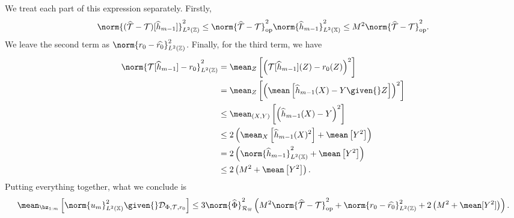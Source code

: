 We treat each part of this expression separately.
Firstly,
\begin{align*}
    \norm{ ( \hat{ \mathcal{T} } - \mathcal{T} ) [ \hat{ h }_{ m-1 } ] }_{ L^2 ( \mathbb{Z} ) }^2
    \leq \norm{ \hat{ \mathcal{T} } - \mathcal{T} }_{ \mathrm{op} }^2 \norm{ \hat{ h }_{ m-1 } }_{ L^2 ( \mathbb{X} ) }^2
    \leq M^2 \norm{ \hat{ \mathcal{T} } - \mathcal{T} }_{ \mathrm{op} }^2
.\end{align*}
We leave the second term as $ \norm{ r_{ 0 } - \hat{ r_{ 0 } } }_{ L^{ 2 } ( \mathbb{Z} ) }^2 $.
Finally, for the third term, we have
\begin{align*}
    \norm{ \mathcal{T} [ \hat{ h }_{ m-1 } ] - r_{ 0 } }_{ L^2 ( \mathbb{Z} ) }^2
    &= \mean_{ Z } \left[
        \left(
            \mathcal{T} [ \hat{ h }_{ m-1 } ] ( Z ) - r_{ 0 } ( Z )
        \right)^2
    \right] \\
    &= \mean_{ Z } \left[
        \left(
            \mean \left[ \hat{ h }_{ m-1 } ( X ) - Y \given{} Z \right]
        \right)^2
    \right] \\
    &\leq \mean_{ ( X, Y ) } \left[
        \left(
            \hat{ h }_{ m-1 } ( X ) - Y
        \right)^2
    \right] \\
    &\leq 2 \left(
        \mean_{ X } \left[ \hat{ h }_{ m-1 } ( X )^2 \right]
        + \mean \left[ Y^2 \right]
    \right) \\
    &= 2 \left(
        \norm{ \hat{ h }_{ m-1 } }_{ L^2 ( \mathbb{X} ) }^2
        + \mean \left[ Y^2 \right]
    \right) \\
    &\leq 2 \left( M^2 + \mean \left[ Y^2 \right] \right)
.\end{align*}
Putting everything together, what we conclude is
\begin{align*}
    \mean_{ \bz_{ 1:m } } \left[
        \norm{ u_{ m } }_{ L^2 ( \mathbb{X} ) }^2 \given{} \dataoff
    \right]
    \leq
    3 \norm{ \hat{ \Phi } }_{ \rkhsw }^2 \left(
        M^2 \norm{ \hat{ \mathcal{T} } - \mathcal{T} }_{ \mathrm{op} }^2
        + \norm{ r_{ 0 } - \hat{ r_{ 0 } } }_{ L^2 ( \mathbb{Z} ) }^2
        + 2 \left( M^2 + \mean [ Y^2 ] \right)
    \right)
.\end{align*}

